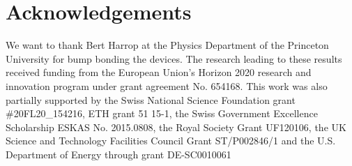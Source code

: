 \section*{Acknowledgements} 
We want to thank Bert Harrop at the Physics Department of the Princeton University for bump bonding the devices. The research leading to these results received funding from the European Union's Horizon 2020 research and innovation program under grant agreement No. 654168. This work was also partially supported by the Swiss National Science Foundation grant \#20FL20\_154216, ETH grant 51 15-1, the  Swiss Government Excellence Scholarship ESKAS No. 2015.0808, the Royal Society Grant UF120106, the UK Science and Technology Facilities Council Grant ST/P002846/1 and the U.S. Department of Energy through grant DE-SC0010061
